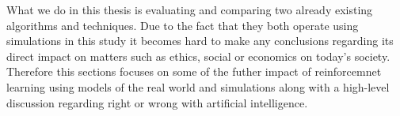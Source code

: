 What we do in this thesis is evaluating and comparing two already existing algorithms and techniques. Due to the fact that they both operate using simulations in this study it becomes hard to make any conclusions regarding its direct impact on matters such as ethics, social or economics on today's society. Therefore this sections focuses on some of the futher impact of reinforcemnet learning using models of the real world and simulations along with a high-level discussion regarding right or wrong with artificial intelligence.